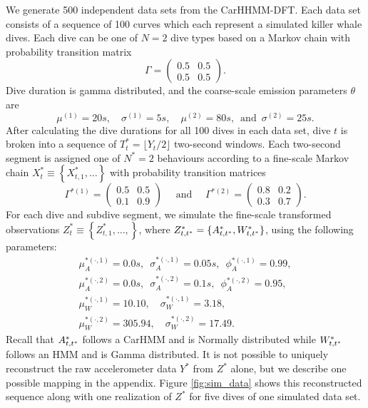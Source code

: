 We generate 500 independent data sets from the CarHHMM-DFT. Each data set consists of a sequence of 100 curves which each represent a simulated killer whale dives. Each dive can be one of $N=2$ dive types based on a Markov chain with probability transition matrix
%
$$\Gamma = \begin{pmatrix} 0.5 & 0.5 \\ 0.5 & 0.5 \end{pmatrix}.$$
%
Dive duration is gamma distributed, and the coarse-scale emission parameters $\theta$ are
$$
    \mu^{(1)} = 20s, \quad \sigma^{(1)} = 5s, \quad
    \mu^{(2)} = 80s, \enspace \text{and} \enspace \sigma^{(2)} = 25s.
$$
%
After calculating the dive durations for all 100 dives in each data set, dive $t$ is broken into a sequence of $T^*_t = \lfloor Y_t/2 \rfloor$ two-second windows. Each two-second segment is assigned one of $N^*=2$ behaviours according to a fine-scale Markov chain $X^*_t \equiv \left\{X^*_{t,1}, \ldots \right\}$ with probability transition matrices
%
$$\Gamma^{*(1)} = \begin{pmatrix} 0.5 & 0.5 \\ 0.1 & 0.9 \end{pmatrix} \quad \text{ and } \quad \Gamma^{*(2)} = \begin{pmatrix} 0.8 & 0.2 \\ 0.3 & 0.7 \end{pmatrix}.$$ 
%
For each dive and subdive segment, we simulate the fine-scale transformed observations $Z^*_t \equiv \left\{Z^*_{t,1}, \ldots, \right\}$, where $Z^*_{t,t^*} = \{A^*_{t,t^*},W^*_{t,t^*}\}$, using the following parameters:
%
\begin{gather*}
    \mu_A^{*(\cdot,1)} = 0.0 s, \enspace \sigma_A^{*(\cdot,1)} = 0.05s, \enspace \phi_A^{*(\cdot,1)} = 0.99, \\
    \mu_A^{*(\cdot,2)} = 0.0 s, \enspace \sigma_A^{*(\cdot,2)} = 0.1s, \enspace \phi_A^{*(\cdot,2)} = 0.95, \\
    \mu_W^{*(\cdot,1)} = 10.10, \quad \sigma_W^{*(\cdot,1)} = 3.18, \\
    \mu_W^{*(\cdot,2)} = 305.94, \quad \sigma_W^{*(\cdot,2)} = 17.49.
\end{gather*}
%
Recall that $A^*_{t,t^*}$ follows a CarHMM and is Normally distributed while $W^*_{t,t^*}$ follows an HMM and is Gamma distributed. It is not possible to uniquely reconstruct the raw accelerometer data $Y^*$ from $Z^*$ alone, but we describe one possible mapping in the appendix. Figure \ref{fig:sim_data} shows this reconstructed sequence along with one realization of $Z^*$ for five dives of one simulated data set. 

